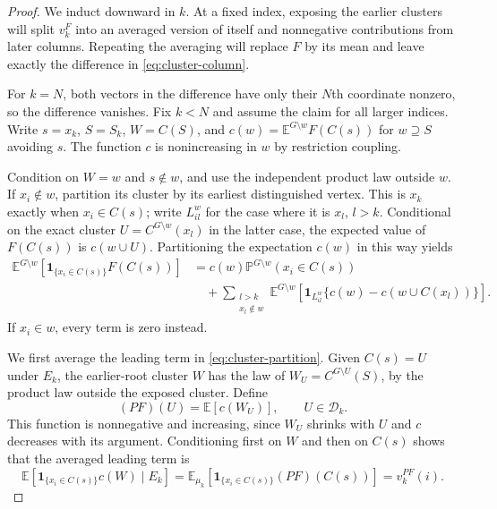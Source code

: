 \begin{proof}
We induct downward in $k$. At a fixed index, exposing the earlier
clusters will split $v_k^F$ into an averaged version of itself and
nonnegative contributions from later columns. Repeating the averaging
will replace $F$ by its mean and leave exactly the difference in
\eqref{eq:cluster-column}.

For $k=N$, both vectors in the difference have only their $N$th
coordinate nonzero, so the difference vanishes. Fix $k<N$ and assume
the claim for all larger indices.  Write
$s=x_k$, $S=S_k$, $W=C(S)$, and
$c(w)=\mathbb E^{G\setminus w}F(C(s))$ for $w\supseteq S$ avoiding $s$.
The function $c$ is nonincreasing in $w$ by restriction coupling.

Condition on $W=w$ and $s\notin w$, and use the independent product
law outside $w$.  If $x_i\notin w$, partition its cluster by its earliest
distinguished vertex.  This is $x_k$ exactly when $x_i\in C(s)$;
write $L_{il}^w$ for the case where it is $x_l$, $l>k$.
Conditional on the exact cluster $U=C^{G\setminus w}(x_l)$ in the latter
case, the expected value of $F(C(s))$ is $c(w\cup U)$.
Partitioning the expectation $c(w)$ in this way yields
\begin{equation}
\label{eq:cluster-partition}
\begin{split}
 \mathbb E^{G\setminus w}
    [\mathbf1_{\{x_i\in C(s)\}}F(C(s))]
 &=c(w)\mathbb P^{G\setminus w}(x_i\in C(s))\\
 &\quad+\sum_{\substack{l>k\\x_l\notin w}}\mathbb E^{G\setminus w}
  [\mathbf1_{L_{il}^w}\{c(w)-c(w\cup C(x_l))\}].
\end{split}
\end{equation}
If $x_i\in w$, every term is zero instead.

We first average the leading term in \eqref{eq:cluster-partition}.
Given $C(s)=U$ under $E_k$, the earlier-root cluster $W$ has the law of
$W_U=C^{G\setminus U}(S)$, by the product law outside the exposed
cluster. Define
\[
 (PF)(U)=\mathbb E[c(W_U)],\qquad U\in\mathcal D_k.
\]
This function is nonnegative and increasing, since $W_U$ shrinks with
$U$ and $c$ decreases with its argument. Conditioning first on $W$ and
then on $C(s)$ shows that the averaged leading term is
\[
 \mathbb E[\mathbf1_{\{x_i\in C(s)\}}c(W)\mid E_k]
 =\mathbb E_{\mu_k}[\mathbf1_{\{x_i\in C(s)\}}(PF)(C(s))]
 =v_k^{PF}(i).
\]


\end{proof}
